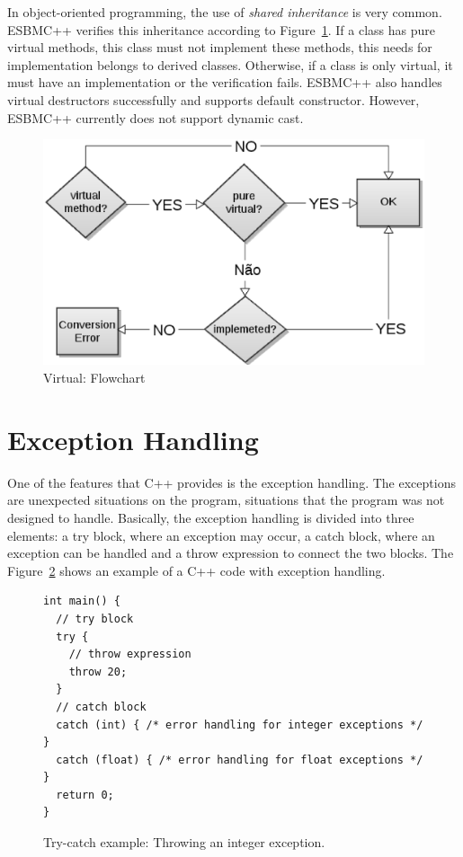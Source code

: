 \documentclass[a4paper]{llncs}
\begin{document}
In object-oriented programming, the use of \textit{shared inheritance} is very common.
ESBMC++ verifies this inheritance according to Figure~\ref{figure:virtual_flow}.
If a class has pure virtual methods, this class must not implement these methods,
this needs for implementation belongs to derived classes.
Otherwise, if a class is only virtual, it must have an implementation or
the verification fails. ESBMC++ also handles virtual destructors successfully
and supports default constructor. However, ESBMC++ currently does not support
dynamic cast.

\begin{figure}[ht]
\centering
\includegraphics[scale=0.4]{figures/virtual-fluxograma}
\caption{Virtual: Flowchart}
\label{figure:virtual_flow}
\end{figure}


\section{Exception Handling}

One of the features that C++ provides is the exception handling. The exceptions are unexpected situations on the program, situations
that the program was not designed to handle. Basically, the exception handling is divided into three elements: a try block, where an
exception may occur, a catch block, where an exception can be handled and a throw expression to connect the two blocks. The
Figure~\ref{figure:try-catch-example} shows an example of a C++ code with exception handling.

\begin{figure}[ht]
\centering
\begin{minipage}{1.0\textwidth}
\begin{lstlisting}
int main() {
  // try block
  try {
    // throw expression
    throw 20;
  }
  // catch block
  catch (int) { /* error handling for integer exceptions */ }
  catch (float) { /* error handling for float exceptions */ }
  return 0;
}
\end{lstlisting}
\end{minipage}
\caption{Try-catch example: Throwing an integer exception.}
\label{figure:try-catch-example}
\end{figure}
\end{document}
